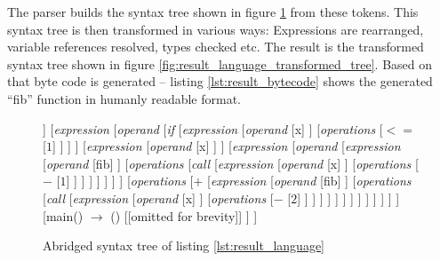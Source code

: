 The parser builds the syntax tree shown in figure \ref{fig:result_language_parser_tree} from these tokens. This syntax tree is then transformed in various ways: Expressions are rearranged, variable references resolved, types checked etc. The result is the transformed syntax tree shown in figure \ref{fig:result_language_transformed_tree}. Based on that byte code is generated -- listing \ref{lst:result_bytecode} shows the generated ``fib'' function in humanly readable format.

\begin{figure}
\centering
\begin{forest}
[\textit{file}
	[{fib() $\rightarrow$ i32}
		[\textit{arguments}
			[{x : i32}]
		]
		[\textit{expression}
			[\textit{operand}
				[\textit{if}
					[\textit{expression}
						[\textit{operand}
							[x]
						]
						[\textit{operations}
							[{$<=$}
								[{$1$}]
							]
						]
					]
					[\textit{expression}
						[\textit{operand}
							[x]
						]
					]
					[\textit{expression}
						[\textit{operand}
							[\textit{expression}
								[\textit{operand}
									[fib]
								]
								[\textit{operations}
									[\textit{call}
										[\textit{expression}
											[\textit{operand}
												[x]
											]
											[\textit{operations}
												[{$-$}
													[{$1$}]
												]
											]
										]
									]
								]
							]
						]
						[\textit{operations}
							[{$+$}
								[\textit{expression}
									[\textit{operand}
										[fib]
									]
									[\textit{operations}
										[\textit{call}
											[\textit{expression}
												[\textit{operand}
													[x]
												]
												[\textit{operations}
													[{$-$}
														[{$2$}]
													]
												]
											]
										]
									]
								]
							]
						]
					]
				]
			]
		]
	]
	[{main() $\rightarrow$ ()}
		[{[omitted for brevity]}]
	]
]
\end{forest}
\caption{Abridged syntax tree of listing \ref{lst:result_language}}
\label{fig:result_language_parser_tree}
\end{figure}

